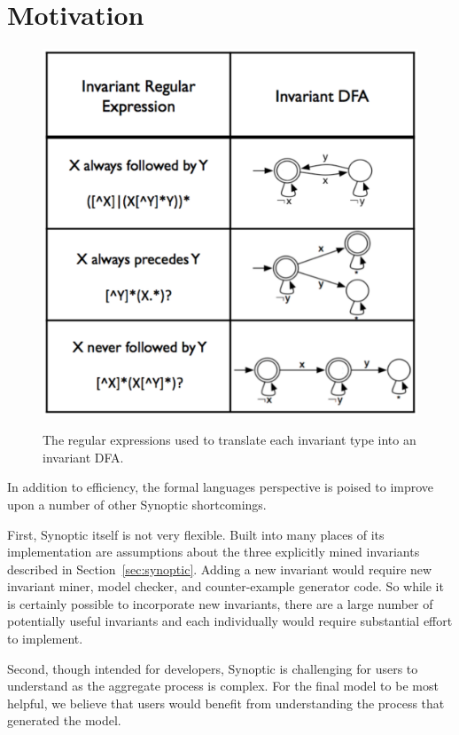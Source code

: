 \section{Motivation}
\label{sec:motivation}
\begin{figure}
   {\includegraphics[width=\columnwidth]{fig/invRegexDfa.pdf}}
   \caption{The regular expressions used to translate each invariant type into
   an
   invariant DFA.
    } 
   \label{fig:invRegDfa}
\end{figure}
In addition to efficiency, the formal languages perspective is poised to improve
upon a number of other Synoptic shortcomings. 

First, Synoptic itself is not very flexible.
Built into many places of its implementation are assumptions about the three explicitly
mined invariants described in Section~\ref{sec:synoptic}. Adding a new invariant would require new invariant
miner, model checker, and counter-example generator code. So while it is
certainly possible to incorporate new invariants, there are a large
number of potentially useful invariants and each individually would require 
substantial effort to implement. 

Second, though intended for developers, Synoptic is challenging for users to
understand as the aggregate process is complex. For the final model to be most
helpful, we believe that users would benefit from understanding the process
that generated the model.

